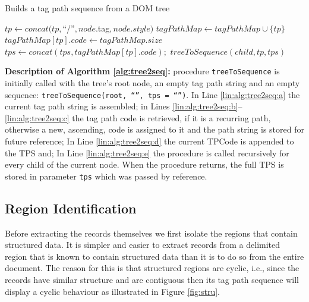 \vspace{-0.3cm}

\begin{small}
\begin{algorithm}[h]
\caption{\small{Builds a tag path sequence from a DOM tree}}
\label{alg:tree2seq}
\begin{algorithmic}[1]
\State $tp \leftarrow
concat(tp,$``/''$,node.$tag$,node.style)$\label{lin:alg:tree2seq:a}
 \label{lin:alg:tree2seq:b}
\State $tagPathMap \leftarrow tagPathMap \cup \{tp\}$ 
\State $tagPathMap[tp].code \leftarrow tagPathMap.size$ 
\EndIf \label{lin:alg:tree2seq:c}
\State $tps \leftarrow
concat(tps,tagPathMap[tp].code);$\label{lin:alg:tree2seq:d}
\State $treeToSequence(child,tp,tps)$\label{lin:alg:tree2seq:e} 
\EndFor 
\EndProcedure
\end{algorithmic}
\end{algorithm}
\end{small}

\vspace{-0.3cm}

\textbf{Description of Algorithm \ref{alg:tree2seq}:} procedure
\texttt{treeToSequence} is initially called with the tree's root node, an empty
tag path string and an empty sequence: \texttt{treeToSequence}\texttt{(root,
``'', tps = ``'')}. In Line \ref{lin:alg:tree2seq:a} the current tag path string is
assembled; in Lines \ref{lin:alg:tree2seq:b}--\ref{lin:alg:tree2seq:c} the tag
path code is retrieved, if it is a recurring path, otherwise a new, ascending,
code is assigned to it and the path string is stored for future reference; In
Line \ref{lin:alg:tree2seq:d} the current TPCode is appended to the TPS and; In
Line \ref{lin:alg:tree2seq:e} the procedure is called recursively for every
child of the current node. When the procedure returns, the full TPS is stored in
parameter \texttt{tps} which was passed by reference.

\subsection{Region Identification}\label{ss:regi}

Before extracting the records themselves we first isolate the regions that
contain structured data. It is simpler and easier to extract records from a
delimited region that is known to contain structured data than it is to do so
from the entire document. The reason for this is that structured regions are
cyclic, i.e., since the records have similar structure and are contiguous then
its tag path sequence will display a cyclic behaviour as illustrated in Figure
\ref{fig:stru}.

